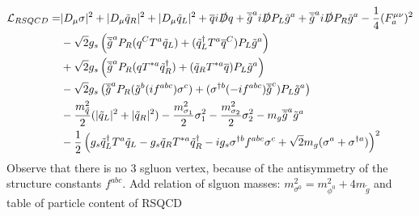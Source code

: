 \begin{align}
\mathcal{L}_{RSQCD} = & |D_\mu \sigma|^2 + |D_\mu \tilde{q}_R|^2 + |D_\mu \tilde{q}_L|^2 + \overline{q}i\slashed{D}q + \overline{\tilde{g}}^ai\slashed{D}P_L\tilde{g}^a + \overline{\tilde{g}}^ai\slashed{D}P_R\tilde{g}^a - \frac{1}{4} (F_a^{\mu\nu})^2\nonumber\\
& -\sqrt{2}g_s \left( \overline{\tilde{g}}^a P_R (q^C T^a \tilde{q}_L) + (\tilde{q}_L^\dagger T^a \overline{q}^C)P_L\tilde{g}^a \right)\nonumber\\
& +\sqrt{2}g_s \left( \overline{\tilde{g}}^a P_R (q T^{\ast a} \tilde{q}_R^\dagger) + (\tilde{q}_R T^{\ast a} \overline{q})P_L\tilde{g}^a \right) \nonumber\\
& -\sqrt{2}g_s \left( \overline{\tilde{g}}^a P_R (\tilde{g}^b (if^{abc}) \sigma^c) + (\sigma^{\dagger b} (-if^{abc}) \overline{\tilde{g}}^c)P_L\tilde{g}^a \right) \nonumber\\
& -\frac{m_{\tilde{q}}^2}{2}(|\tilde{q}_L|^2 + |\tilde{q}_R|^2) -\frac{m_{\sigma_1}^2}{2}\sigma_1^2 -\frac{m_{\sigma_2}^2}{2}\sigma_2^2 -m_g \overline{\tilde{g}}^a\tilde{g}^a\nonumber\\
& -\frac{1}{2}\left( g_s \tilde{q}_L^\dagger T^a \tilde{q}_L - g_s \tilde{q}_R T^{\ast a} \tilde{q}_R^\dagger - ig_s\sigma^{\dagger b}f^{abc}\sigma^c + \sqrt{2}m_g(\sigma^a + \sigma^{\dagger a}) \right)^2\label{eq:L_RSQCD}
\end{align}
Observe that there is no 3 sgluon vertex, because of the antisymmetry of the structure constants $f^{abc}$.
Add relation of slguon masses: $m_{\sigma^0}^2 = m_{\phi^0}^2 + 4 m_{\tilde{g}}$ and table of particle content of RSQCD
\newpage

